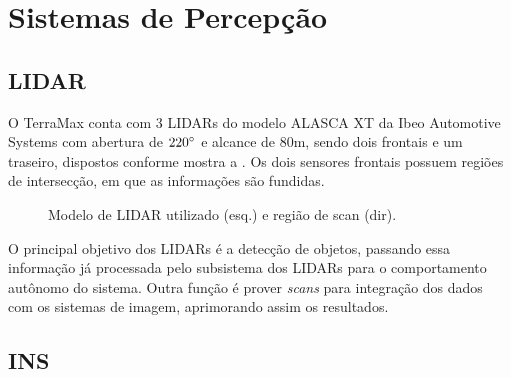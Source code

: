 \section{Sistemas de Percepção}\label{sec:perception}

\subsection{LIDAR}

O TerraMax conta com 3 LIDARs do modelo ALASCA XT da Ibeo Automotive Systems com abertura de $220^{\circ}$ e alcance de 80m, sendo dois frontais e um traseiro, dispostos conforme mostra a . Os dois sensores frontais possuem regiões de intersecção, em que as informações são fundidas.

\begin{figure}[h]
\centering
{}\qquad\qquad
{}
\caption{Modelo de LIDAR utilizado (esq.) e região de scan (dir).}%
\label{fig:lidar}%
\end{figure}

O principal objetivo dos LIDARs é a detecção de objetos, passando essa informação já processada pelo subsistema dos LIDARs para o comportamento autônomo do sistema. Outra função é prover \emph{scans} para integração dos dados com os sistemas de imagem, aprimorando assim os resultados.

\subsection{INS}

